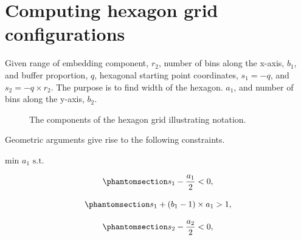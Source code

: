 \documentclass[
  12pt]{article}
\begin{document}
\section{Computing hexagon grid
configurations}\label{computing-hexagon-grid-configurations}

Given range of embedding component, \(r_2\), number of bins along the
x-axis, \(b_1\), and buffer proportion, \(q\), hexagonal starting point
coordinates, \(s_1 = -q\), and \(s_2 = -q \times r_2\). The purpose is
to find width of the hexagon. \(a_1\), and number of bins along the
y-axis, \(b_2\).

\begin{figure}[H]


\caption{\label{fig-hex-param}The components of the hexagon grid
illustrating notation.}

\end{figure}%

Geometric arguments give rise to the following constraints.

\(\text{min }a_1 \text{ s.t.}\)

\begin{equation}\phantomsection\label{eq-equation1}{
s_1 - \frac{a_1}{2} < 0,
}\end{equation}

\begin{equation}\phantomsection\label{eq-equation2}{
s_1 + (b_1 - 1) \times a_1 > 1,
}\end{equation}

\begin{equation}\phantomsection\label{eq-equation4}{
s_2 - \frac{a_2}{2} < 0,
}\end{equation}
\end{document}
